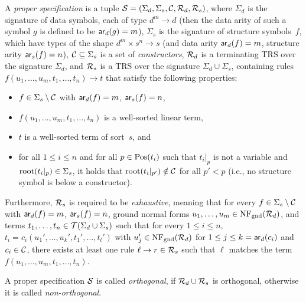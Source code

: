 \documentclass{eptcs}
\begin{document}
\begin{definition}
\label{def:Spec}
A \emph{proper specification} is a tuple
$\mathcal{S} = (\Sigma_d,\Sigma_s,\mathcal{C},\mathcal{R}_d,\mathcal{R}_s)$,
where $\Sigma_d$ is the signature of data symbols, each of type $d^m \to d$
(then the data arity of such a symbol $g$ is defined to be $\mathsf{ar}_d(g) = m$),
$\Sigma_s$ is the signature of structure symbols~$f$,
which have types of the shape $d^m \times s^n \to s$
(and data arity $\mathsf{ar}_d(f) = m$, structure arity $\mathsf{ar}_s(f) = n$),
$\mathcal{C} \subseteq \Sigma_s$ is a set of \emph{constructors},
$\mathcal{R}_d$ is a terminating TRS over the signature $\Sigma_d$, and
$\mathcal{R}_s$ is a TRS over the signature $\Sigma_d \cup \Sigma_s$,
containing rules $f(u_1, \dotsc, u_m, t_1, \dotsc, t_n) \to t$
that satisfy the following properties:
\begin{itemize}
\item
$f \in \Sigma_s \setminus \mathcal{C}$ with $\mathsf{ar}_d(f) = m$, $\mathsf{ar}_s(f) = n$,

\item
$f(u_1, \dotsc, u_m, t_1, \dotsc, t_n)$ is a well-sorted linear term,

\item
$t$ is a well-sorted term of sort~$s$, and

\item
for all $1 \le i \le n$ and for all $p \in \mathrm{Pos}(t_i)$ such that $t_i|_p$ is not
a variable and $\mathrm{root}(t_i|_p) \in \Sigma_s$, it holds that
$\mathrm{root}(t_i|_{p'}) \notin \mathcal{C}$ for all $p' < p$
(i.e., no structure symbol is below a constructor).
\end{itemize}

Furthermore, $\mathcal{R}_s$ is required to be \emph{exhaustive}, meaning that for every
$f \in \Sigma_s \setminus \mathcal{C}$ with $\mathsf{ar}_d(f) = m$, $\mathsf{ar}_s(f) = n$, ground normal
forms $u_1, \dotsc, u_m \in \mathrm{NF}_{\mathrm{gnd}}(\mathcal{R}_d)$, and terms
$t_1, \dotsc, t_n \in \mathcal{T}(\Sigma_d \cup \Sigma_s)$ such that for every
$1 \le i \le n$,
$t_i = c_i(u_1', \dotsc, u_k', t_1', \dotsc, t_l')$ with
$u_j' \in \mathrm{NF}_{\mathrm{gnd}}(\mathcal{R}_d)$ for $1 \le j \le k = \mathsf{ar}_d(c_i)$ and
$c_i \in \mathcal{C}$, there exists at least one rule $\ell \to r \in \mathcal{R}_s$ such that
$\ell$ matches the term $f(u_1, \dotsc, u_m, t_1, \dotsc, t_n)$.

A proper specification $\mathcal{S}$ is called \emph{orthogonal}, if $\mathcal{R}_d \cup \mathcal{R}_s$
is orthogonal, otherwise it is called \emph{non-orthogonal}.
\end{definition}
\end{document}
